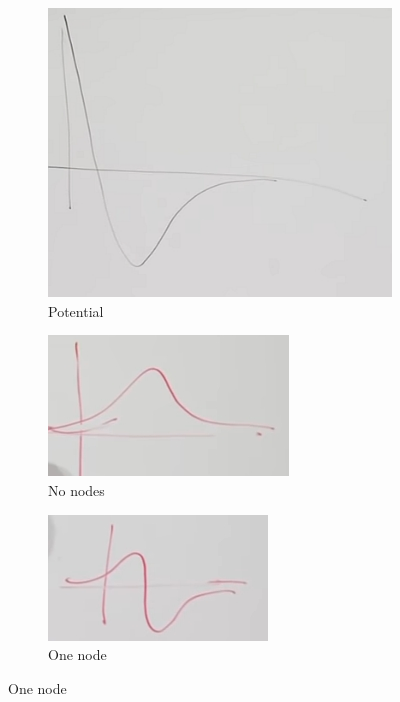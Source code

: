 \documentclass[]{article}
\begin{document}
\begin{figure}[H]
	\caption{Solving Central Potential Schro\"dinger Equation (\ref{eq:schroedinger:central})}
	\begin{subfigure}[t]{0.45\textwidth}
		\caption{Potential}\label{fig:aqm-3-central-potential}
		\includegraphics[width=\textwidth]{aqm-3-central-potential}
	\end{subfigure}
	\begin{subfigure}[t]{0.45\textwidth}
		\caption{No nodes}\label{fig:aqm-3-central-0node}
		\includegraphics[width=\textwidth]{aqm-3-central-0node}
	\end{subfigure}
	\begin{subfigure}[t]{0.45\textwidth}
		\caption{One node}\label{fig:aqm-3-central-1node}
		\includegraphics[width=\textwidth]{aqm-3-central-1node}

\end{subfigure}
\end{figure}
\end{document}

